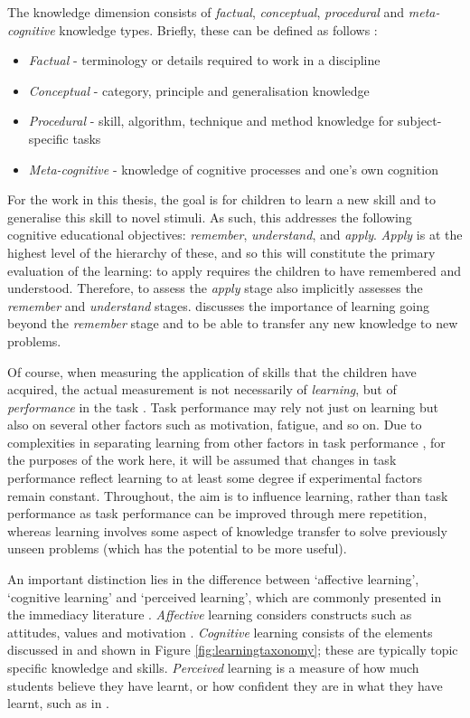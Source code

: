 The knowledge dimension consists of \textit{factual}, \textit{conceptual}, \textit{procedural} and \textit{meta-cognitive} knowledge types. Briefly, these can be defined as follows \citep{krathwohl2002revision}:
\begin{itemize}
	\item \textit{Factual} - terminology or details required to work in a discipline
	\item \textit{Conceptual} - category, principle and generalisation knowledge
	\item \textit{Procedural} - skill, algorithm, technique and method knowledge for subject-specific tasks
	\item \textit{Meta-cognitive} - knowledge of cognitive processes and one's own cognition
\end{itemize}

For the work in this thesis, the goal is for children to learn a new skill and to generalise this skill to novel stimuli. As such, this addresses the following cognitive educational objectives: \textit{remember}, \textit{understand}, and \textit{apply}. \textit{Apply} is at the highest level of the hierarchy of these, and so this will constitute the primary evaluation of the learning: to apply requires the children to have remembered and understood. Therefore, to assess the \textit{apply} stage also implicitly assesses the \textit{remember} and \textit{understand} stages. \cite{mayer2002rote} discusses the importance of learning going beyond the \textit{remember} stage and to be able to transfer any new knowledge to new problems.

Of course, when measuring the application of skills that the children have acquired, the actual measurement is not necessarily of \textit{learning}, but of \textit{performance} in the task \citep{mikulas1977learning}. Task performance may rely not just on learning but also on several other factors such as motivation, fatigue, and so on. Due to complexities in separating learning from other factors in task performance \citep{mikulas1977learning}, for the purposes of the work here, it will be assumed that changes in task performance reflect learning to at least some degree if experimental factors remain constant. Throughout, the aim is to influence learning, rather than task performance as task performance can be improved through mere repetition, whereas learning involves some aspect of knowledge transfer to solve previously unseen problems (which has the potential to be more useful).

An important distinction lies in the difference between `affective learning', `cognitive learning' and `perceived learning', which are commonly presented in the \gls{immediacy} literature \citep{witt2004meta}. \textit{Affective} learning considers constructs such as attitudes, values and motivation \citep{krathwohl1964taxonomy}. \textit{Cognitive} learning consists of the elements discussed in \cite{krathwohl2002revision} and shown in Figure \ref{fig:learningtaxonomy}; these are typically topic specific knowledge and skills. \textit{Perceived} learning is a measure of how much students believe they have learnt, or how confident they are in what they have learnt, such as in \cite{gorham1988relationship}.

